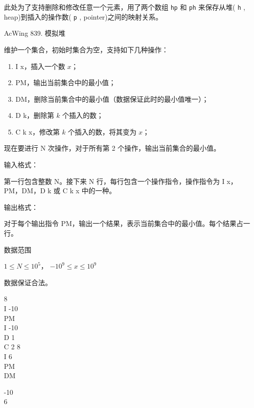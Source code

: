 此处为了支持删除和修改任意一个元素，用了两个数组 \lstinline{hp} 和 \lstinline{ph} 来保存从堆( \lstinline{h} , heap)到插入的操作数( \lstinline{p} , pointer)之间的映射关系。

\begin{titledbox}{AcWing 839. 模拟堆}

维护一个集合，初始时集合为空，支持如下几种操作：

\begin{enumerate}
    \itemsep=-5pt
    \item I x，插入一个数 $x$；
    \item PM，输出当前集合中的最小值；
    \item DM，删除当前集合中的最小值（数据保证此时的最小值唯一）；
    \item D k，删除第 $k$ 个插入的数；
    \item C k x，修改第 $k$ 个插入的数，将其变为 $x$；
\end{enumerate}

现在要进行 N 次操作，对于所有第 2 个操作，输出当前集合的最小值。

输入格式：

第一行包含整数 N。接下来 N 行，每行包含一个操作指令，操作指令为 I x，PM，DM，D k 或 C k x 中的一种。

输出格式：

对于每个输出指令 PM，输出一个结果，表示当前集合中的最小值。每个结果占一行。

数据范围

$1 \le N \le 10^5$， $−10^9 \le x \le 10^9$

数据保证合法。

\begin{inputblock}
    8 \\
    I -10 \\
    PM \\
    I -10 \\
    D 1 \\
    C 2 8 \\
    I 6 \\
    PM \\
    DM
\end{inputblock}
\begin{outputblock}
    -10 \\
    6
\end{outputblock}
\end{titledbox}

